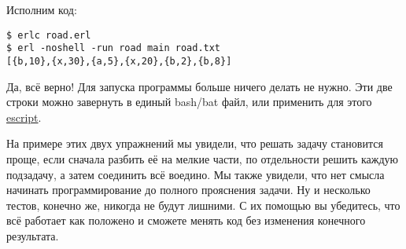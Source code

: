 Исполним код:
\begin{lstlisting}[style=erlang]
$ erlc road.erl
$ erl -noshell -run road main road.txt
[{b,10},{x,30},{a,5},{x,20},{b,2},{b,8}]
\end{lstlisting}

Да, всё верно!
Для запуска программы больше ничего делать не нужно.
Эти две строки можно завернуть в единый bash/bat файл, или применить для этого \href{http://erlang.org/doc/man/escript.html}{escript}.

На примере этих двух упражнений мы увидели, что решать задачу становится проще, если сначала разбить её на мелкие части, по отдельности решить каждую подзадачу, а затем соединить всё воедино.
Мы также увидели, что нет смысла  начинать программирование до полного прояснения задачи.
Ну и несколько тестов, конечно же, никогда не будут лишними.
С их помощью вы убедитесь, что всё работает как положено и сможете менять код без изменения конечного результата.

